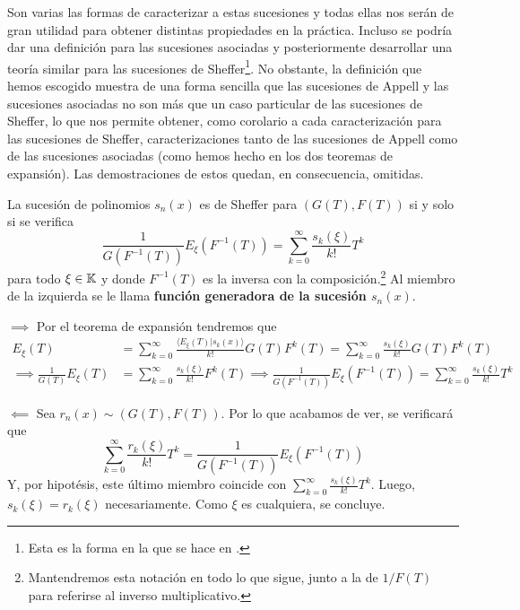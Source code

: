 Son varias las formas de caracterizar a estas sucesiones y todas ellas nos serán de gran utilidad para obtener distintas propiedades en la práctica. Incluso se podría dar una definición para las sucesiones asociadas y posteriormente desarrollar una teoría similar para las sucesiones de Sheffer\footnote{Esta es la forma en la que se hace en \cite{roman1}.}. No obstante, la definición que hemos escogido muestra de una forma sencilla que las sucesiones de Appell y las sucesiones asociadas no son más que un caso particular de las sucesiones de Sheffer, lo que nos permite obtener, como corolario a cada caracterización para las sucesiones de Sheffer, caracterizaciones tanto de las sucesiones de Appell como de las sucesiones asociadas (como hemos hecho en los dos teoremas de expansión). Las demostraciones de estos quedan, en consecuencia, omitidas.

\begin{teorema}\label{funcion generadora}
    La sucesión de polinomios $s_n(x)$ es de Sheffer para $(G(T), F(T))$ si y solo si se verifica
    \begin{equation*}
        \frac{1}{G(F^{-1}(T))}E_{\xi} (F^{-1}(T)) = \sum_{k=0}^\infty \frac{s_k(\xi)}{k!}T^k
    \end{equation*}
    para todo $\xi \in \mathbb{K}$ y donde $F^{-1}(T)$ es la inversa con la composición.\footnote{Mantendremos esta notación en todo lo que sigue, junto a la de $1/F(T)$ para referirse al inverso multiplicativo.} Al miembro de la izquierda se le llama \textbf{función generadora de la sucesión $s_n(x)$}.
\end{teorema}

\begin{demo}
    $\boxed{\implies}$ Por el teorema de expansión tendremos que
    \begin{align*}
        E_{\xi}(T) & = \sum_{k=0}^\infty \frac{\langle E_{\xi}(T) | s_k(x) \rangle}{k!}G(T)F^k(T) = \sum_{k=0}^\infty \frac{s_k(\xi)}{k!}G(T)F^k(T)\\
        \implies \frac{1}{G(T)}E_{\xi}(T) & = \sum_{k=0}^\infty \frac{s_k(\xi)}{k!}F^k(T) \implies \frac{1}{G(F^{-1}(T))}E_{\xi}(F^{-1}(T)) = \sum_{k=0}^\infty \frac{s_k(\xi)}{k!}T^k 
    \end{align*}

    $\boxed{\impliedby}$ Sea $r_n(x) \sim (G(T), F(T))$. Por lo que acabamos de ver, se verificará que
    \begin{equation*}
        \sum_{k=0}^\infty \frac{r_k(\xi)}{k!}T^k = \frac{1}{G(F^{-1}(T))}E_{\xi}(F^{-1}(T))
    \end{equation*}
    Y, por hipotésis, este último miembro coincide con $\sum_{k=0}^\infty \frac{s_k(\xi)}{k!}T^k$. Luego, $s_k(\xi) = r_k(\xi)$ necesariamente. Como $\xi$ es cualquiera, se concluye.
\end{demo}

